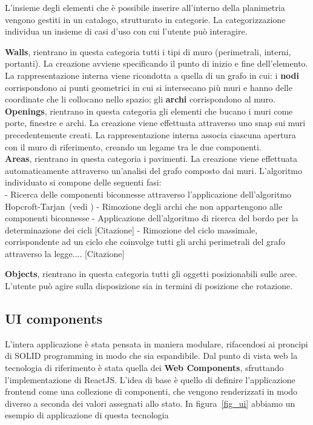 L'insieme degli elementi che \`e possibile inserire all'interno della planimetria vengono gestiti in un catalogo, strutturato in categorie.
La categorizzazione individua un insieme di casi d'uso con cui l'utente pu\`o interagire.

\textbf{Walls}, rientrano in questa categoria tutti i tipi di muro (perimetrali, interni, portanti). La creazione avviene specificando il punto di inizio e fine dell'elemento. La rappresentazione interna viene ricondotta a quella di un grafo in cui: i \textbf{nodi} corrispondono ai punti geometrici in cui si intersecano pi\`u muri e hanno delle coordinate che li collocano nello spazio; gli \textbf{archi} corrispondono al muro.\\
\textbf{Openings}, rientrano in questa categoria gli elementi che bucano i muri come porte, finestre e archi. La creazione viene effettuata attraverso uno snap sui muri precedentemente creati. La rappresentazione interna associa ciascuna apertura con il muro di riferimento, creando un legame tra le due componenti.\\
\textbf{Areas}, rientrano in questa categoria i pavimenti. La creazione viene effettuata automaticamente attraverso un'analisi del grafo composto dai muri. L'algoritmo individuato si compone delle seguenti fasi:\\
    - Ricerca delle componenti biconnesse attraverso l'applicazione dell'algoritmo Hopcroft-Tarjan~(vedi \cite{Hopcroft:1973:AEA:362248.362272})
    - Rimozione degli archi che non appartengono alle componenti biconnesse
    - Applicazione dell'algoritmo di ricerca del bordo per la determinazione dei cicli [Citazione]
    - Rimozione del ciclo massimale, corrispondente ad un ciclo che coinvolge tutti gli archi perimetrali del grafo attraverso la legge.... [Citazione]

\textbf{Objects}, rientrano in questa categoria tutti gli oggetti posizionabili sulle aree. L'utente pu\`o agire sulla disposizione sia in termini di posizione che rotazione.\\

\subsection{UI components}

L'intera applicazione \`e stata pensata in maniera modulare, rifacendosi ai proncipi di SOLID programming in modo che sia espandibile. Dal punto di vista web la tecnologia di riferimento \`e stata quella dei \textbf{Web Components}, sfruttando l'implementazione di ReactJS. L'idea di base \`e quello di definire l'applicazione frontend come una collezione di componenti, che vengono renderizzati in modo diverso a seconda dei valori assegnati allo stato. In figura~\ref{fig_ui} abbiamo un esempio di applicazione di questa tecnologia \\

